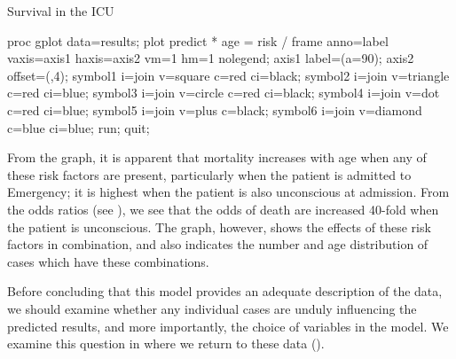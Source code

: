 \begin{Example}[icu1]{Survival in the ICU}
\begin{listing}
proc gplot data=results;
   plot predict * age = risk /
      frame anno=label vaxis=axis1 haxis=axis2 vm=1 hm=1 nolegend;
   axis1 label=(a=90);
   axis2 offset=(,4);
   symbol1 i=join v=square   c=red ci=black;
   symbol2 i=join v=triangle c=red ci=blue;
   symbol3 i=join v=circle   c=red ci=black;
   symbol4 i=join v=dot      c=red ci=blue;
   symbol5 i=join v=plus     c=black;
   symbol6 i=join v=diamond  c=blue ci=blue;
 run; quit;
\end{listing}
From the graph, it is apparent that mortality increases with
age when any of these risk factors are present, particularly
when the patient is admitted to Emergency; it is highest when the
patient is also unconscious at admission.  
From the odds ratios (see ), we see that the
odds of death are increased 40-fold when the patient is unconscious.
The graph, however, shows the effects of these risk factors in
combination, and also indicates the number and age distribution of cases which have these combinations.

Before concluding that this model provides an adequate description of the
data, we should examine whether any individual cases are unduly influencing
the predicted results, and more importantly, the choice of variables in
the model.  We examine this question in 
where we return to these data ().
\end{Example}